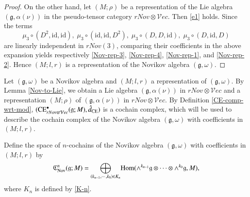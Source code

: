 \documentclass[12pt]{amsart}
\theoremstyle{definition}
\newcommand{\g}{\mathfrak g}
\newcommand{\frkC}{\mathfrak C}
\newcommand{\id}{\mathrm{id}}
\newcommand{\Hom}{\mathrm{Hom}}
\newcommand{\ot}{\otimes}
\newcommand{\ce}{{\rm CE}}
\newcommand{\nov}{{\rm Nov}}
\newcommand{\cc}{\circ}
\begin{document}
\begin{proof}
On the other hand, let $(M;\rho)$ be a representation of the Lie algebra $(\g,\alpha(\nu))$ in the pseudo-tensor category $rNov\ot\mathcal{V}ec$. Then \eqref{e1} holds. Since the terms
$$
\mu_3\cc(D^2,\id,\id), \;\mu_3\cc(\id,\id,D^2),\;\mu_3\cc(D,D,\id),\;\mu_3\cc(D,\id,D)
$$
are linearly independent in $rNov(3)$, comparing their coefficients in the above expansion yields respectively \eqref{Nov-rep-3}, \eqref{Nov-rep-4}, \eqref{Nov-rep-1}, and \eqref{Nov-rep-2}. Hence $(M;l,r)$ is a representation of the Novikov algebra $(\g,\omega)$.
\end{proof}


Let $(\g,\omega)$ be a Novikov algebra and $(M;l,r)$ a representation of $(\g,\omega)$. By Lemma \ref{Nov-to-Lie}, we obtain a Lie algebra $(\g,\alpha(\nu))$ in $rNov\ot\mathcal{V}ec$ and a representation $(M;\rho)$ of $(\g,\alpha(\nu))$ in $rNov\ot\mathcal{V}ec$. By Definition \ref{CE-comp-wrt-mod}, $(\ce_{rNov\ot\mathcal{V}ec}^\bullet(\g;M),\hat{d}_\ce)$ is a cochain complex, which will be used to describe the cochain complex of the Novikov algebra $(\g,\omega)$ with coefficients in $(M;l,r)$.


Define the space of $n$-cochains of the Novikov algebra $(\g,\omega)$ with coefficients in $(M;l,r)$ by
\begin{align}\label{eq:Nov-n-cochain-coeff}
\frkC_{\nov}^n(\mathfrak{g};M)=\underset{(k_{n-1},\cdots,k_0)\in K_n}\bigoplus\Hom(\wedge^{k_{n-1}}\g\ot\cdots\ot\wedge^{k_0}\g,M),
\end{align}
where $K_n$ is defined by \eqref{K-n}.
\end{document}
